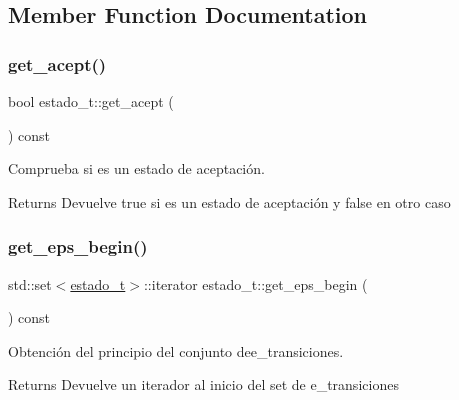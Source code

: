 \subsection{Member Function Documentation}
\mbox{\label{classestado__t_aa142e9b906009925b9aeeeb8712f59b8}} 
\subsubsection{\texorpdfstring{get\+\_\+acept()}{get\_acept()}}
{\footnotesize\ttfamily bool estado\+\_\+t\+::get\+\_\+acept (\begin{DoxyParamCaption}{ }\end{DoxyParamCaption}) const\hspace{0.3cm}{\ttfamily [inline]}}



Comprueba si es un estado de aceptación. 

\begin{DoxyReturn}{Returns}
Devuelve true si es un estado de aceptación y false en otro caso 
\end{DoxyReturn}
\mbox{\label{classestado__t_a47b0d982bf6731d05537da75b001a35b}} 
\subsubsection{\texorpdfstring{get\+\_\+eps\+\_\+begin()}{get\_eps\_begin()}}
{\footnotesize\ttfamily std\+::set$<$\hyperlink{classestado__t}{estado\+\_\+t}$>$\+::iterator estado\+\_\+t\+::get\+\_\+eps\+\_\+begin (\begin{DoxyParamCaption}{ }\end{DoxyParamCaption}) const\hspace{0.3cm}{\ttfamily [inline]}}



Obtención del principio del conjunto dee\+\_\+transiciones. 

\begin{DoxyReturn}{Returns}
Devuelve un iterador al inicio del set de e\+\_\+transiciones 
\end{DoxyReturn}
\mbox{\label{classestado__t_a0c091366f5d27d58036d5b0b901570ae}} 
